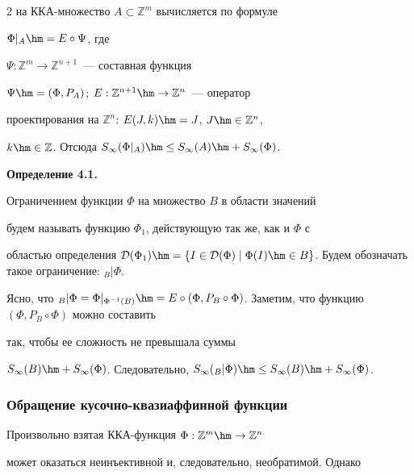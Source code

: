 \begin{multicols}{2}
на ККА-множество $A\subset \mathbb{Z}^m$ вычисляется по формуле

$\Phi|_A \hm= E\circ \Psi$, где

$\Psi:\mathbb{Z}^m\to\mathbb{Z}^{n+1}$~--- составная функция

$\Psi\hm=(\Phi,P_A)$; $E:\mathbb{Z}^{n+1}\hm\to\mathbb{Z}^{n}$~--- оператор

проектирования на $\mathbb{Z}^n$: $E(J,k)\hm=J$, $J\hm\in\mathbb{Z}^n$,

$k\hm\in\mathbb{Z}$. Отсюда $S_\infty(\Phi|_A) \hm\leq

S_\infty(A)\hm+S_\infty(\Phi)$.



\smallskip



\noindent

\textbf{Определение 4.1.}

Ограничением функции $\Phi$ на множество $B$ в области значений

будем называть функцию $\Phi_1$, действующую так же, как и $\Phi$ с

областью определения ${\cal D}(\Phi_1)\hm=\{ I\in {\cal D}(\Phi) \mid

\Phi(I)\hm\in B \}$.  Будем обозначать такое ограничение: $_B|\Phi$.



\smallskip



Ясно, что $_B|\Phi = \Phi|_{\Phi^{-1}(B)} \hm= E\circ (\Phi, P_B\circ

\Phi)$. Заметим, что функцию $(\Phi, P_B\circ \Phi)$ можно составить

так, чтобы ее сложность не превышала суммы

$S_\infty(B)\hm+S_\infty(\Phi)$. Следовательно, $S_\infty(_B|\Phi) \hm\leq

S_\infty(B)\hm+S_\infty(\Phi)$.





\subsubsection{Обращение кусочно-квазиаффинной функции} %



Произвольно взятая ККА-функция $\Phi:\mathbb{Z}^m\hm\to\mathbb{Z}^n$

может оказаться неинъективной и, следовательно, необратимой. Однако


\end{multicols}
